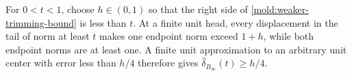 For \(0<t<1\), choose \(h\in(0,1)\) so that the right side of
\eqref{mold:weaker-trimming-bound} is less than \(t\).  At a finite unit head,
every displacement in the tail of norm at least \(t\) makes one endpoint
norm exceed \(1+h\), while both endpoint norms are at least one.  A finite
unit approximation to an arbitrary unit center with error less than
\(h/4\) therefore gives \(\widehat\delta_{B_\infty}(t)\ge h/4\).
